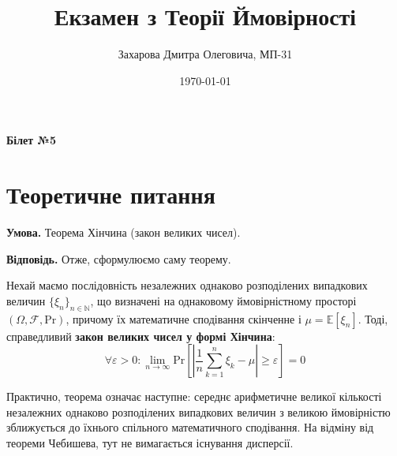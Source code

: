 \documentclass[14pt]{extarticle}
\title{\huge\sffamily\bfseries Екзамен з Теорії Ймовірності}
\author{\Large\sffamily Захарова Дмитра Олеговича, МП-31}
\date{\sffamily \today}
\newcommand{\<}{\langle}
\renewcommand{\>}{\rangle}
\theoremstyle{mystyle}{\newtheorem{definition}{Definition}[section]}
\theoremstyle{mystyle}{\newtheorem{proposition}[definition]{Proposition}}
\theoremstyle{mystyle}{\newtheorem{theorem}[definition]{Theorem}}
\theoremstyle{mystyle}{\newtheorem{lemma}[definition]{Lemma}}
\theoremstyle{mystyle}{\newtheorem{corollary}[definition]{Corollary}}
\theoremstyle{mystyle}{\newtheorem*{remark}{Remark}}
\theoremstyle{mystyle}{\newtheorem*{remarks}{Remarks}}
\theoremstyle{mystyle}{\newtheorem*{example}{Example}}
\theoremstyle{mystyle}{\newtheorem*{examples}{Examples}}
\theoremstyle{definition}{\newtheorem*{exercise}{Exercise}}
\theoremstyle{cstyle}{\newtheorem*{cthm}{}}
\theoremstyle{warn}
\begin{document}
\maketitle

\begin{center}
    \textbf{Білет №5}
\end{center}


\begin{tcolorbox}[title=Вміст, fonttitle=\sffamily\bfseries\selectfont,interior style={left color=contcol1!40!white,right color=contcol2!40!white},frame style={left color=contcol1!80!white,right color=contcol2!80!white},coltitle=black,top=2mm,bottom=2mm,left=2mm,right=2mm,drop fuzzy shadow,enhanced,breakable]
\makeatletter
{}
\makeatother
\end{tcolorbox}

\newpage

\section{Теоретичне питання}

\textbf{Умова.} Теорема Хінчина (закон великих чисел).

\textbf{Відповідь.} Отже, сформулюємо саму теорему.

\begin{theorem}
    Нехай маємо послідовність незалежних однаково розподілених випадкових величин $\{\xi_n\}_{n \in \mathbb{N}}$, що визначені
    на однаковому ймовірністному просторі $(\Omega,\mathcal{F}, \text{Pr})$, причому їх математичне сподівання скінченне і $\mu=\mathbb{E}[\xi_n]$. Тоді,
    справедливий \textbf{закон великих чисел у формі Хінчина}:
    \begin{equation}
        \forall \varepsilon > 0: \lim_{n \to \infty}\text{Pr}\left[\left|\frac{1}{n}\sum_{k=1}^n \xi_k - \mu\right|\geq\varepsilon\right] = 0
    \end{equation}
\end{theorem}

\begin{remark}
    Практично, теорема означає наступне: середнє арифметичне великої кількості незалежних однаково розподілених випадкових величин з великою ймовірністю
    зближується до їхнього спільного математичного сподівання. На відміну від теореми Чебишева, тут не вимагається існування дисперсії.
\end{remark}
\end{document}
